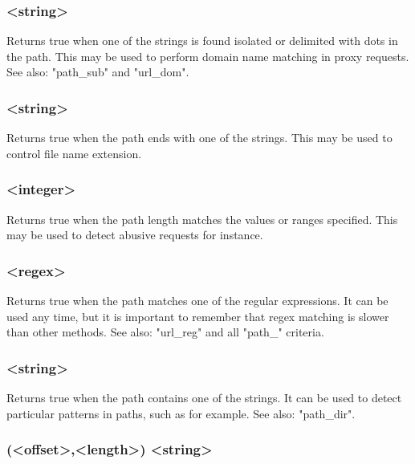 \subsubsection[path\_dom]{ <string>}

  Returns true when one of the strings is found isolated or delimited with dots
  in the path. This may be used to perform domain name matching in proxy
  requests. See also: "path\_sub" and "url\_dom".

\subsubsection[path\_end]{ <string>}

  Returns true when the path ends with one of the strings. This may be used to
  control file name extension.

\subsubsection[path\_len]{ <integer>}

  Returns true when the path length matches the values or ranges specified.
  This may be used to detect abusive requests for instance.

\subsubsection[path\_reg]{ <regex>}

  Returns true when the path matches one of the regular expressions. It can be
  used any time, but it is important to remember that regex matching is slower
  than other methods. See also: "url\_reg" and all "path\_" criteria.

\subsubsection[path\_sub]{ <string>}

  Returns true when the path contains one of the strings. It can be used to
  detect particular patterns in paths, such as  for example. See also:   "path\_dir".

\subsubsection[payload]{(<offset>,<length>) <string>}

